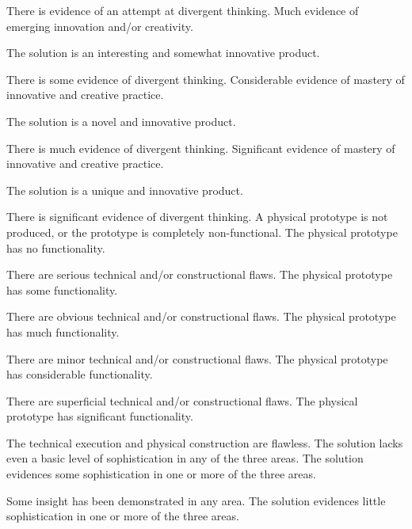 \documentclass{../fal_assignment}
\begin{document}
\begin{markingrubric}
            \par There is evidence of an attempt at divergent thinking.
        \grade Much evidence of emerging innovation and/or creativity.
            \par The solution is an interesting and somewhat innovative product.
            \par There is some evidence of divergent thinking.
        \grade Considerable evidence of mastery of innovative and creative practice.
            \par The solution is a novel and innovative product.
            \par There is much evidence of divergent thinking.
        \grade Significant evidence of mastery of innovative and creative practice.
            \par The solution is a unique and innovative product.
            \par There is significant evidence of divergent thinking.
%            
        \grade\fail A physical prototype is not produced, or the prototype is completely non-functional.
        \grade The physical prototype has no functionality.
            \par There are serious technical and/or constructional flaws.
        \grade The physical prototype has some functionality.
            \par There are obvious technical and/or constructional flaws.
        \grade The physical prototype has much functionality.
            \par There are minor technical and/or constructional flaws.
        \grade The physical prototype has considerable functionality.
            \par There are superficial technical and/or constructional flaws.
        \grade The physical prototype has significant functionality.
            \par The technical execution and physical construction are flawless.
%
        \grade\fail The solution lacks even a basic level of sophistication in any of the three areas.
        \grade The solution evidences some sophistication in one or more of the three areas.
            \par Some insight has been demonstrated in any area.
        \grade The solution evidences little sophistication in one or more of the three areas.

\end{markingrubric}
\end{document}
